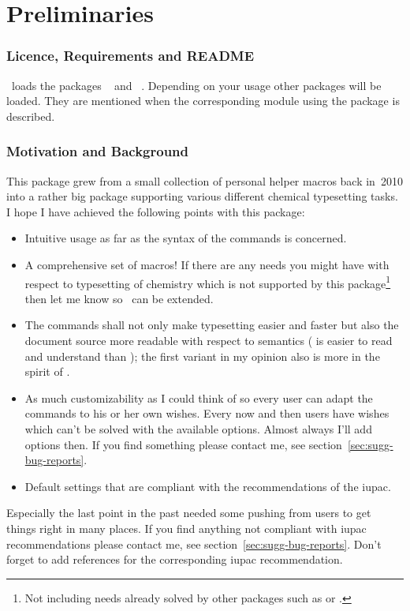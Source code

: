 \documentclass{chemmacros-manual}
\begin{document}
\part{Preliminaries}
\section{Licence, Requirements and \textsc{README}}\label{sec:licence-requ-readme}
\license

\chemmacros\ loads the packages ~\cite{bnd:l3kernel} and
~\cite{bnd:l3packages}.  Depending on your usage other packages
will be loaded.  They are mentioned when the corresponding module using the
package is described.

\section{Motivation and Background}\label{sec:motiv-backgr}
This package grew from a small collection of personal helper macros back
in~2010 into a rather big package supporting various different chemical
typesetting tasks.  I hope I have achieved the following points with this
package:
\begin{itemize}
  \item Intuitive usage as far as the syntax of the commands is concerned.
  \item A comprehensive set of macros! If there are any needs you might have
    with respect to typesetting of chemistry which is not supported by this
    package\footnote{Not including needs already solved by other packages such
      as  or .} then let me know so \chemmacros\ can
    be extended.
  \item The commands shall not only make typesetting easier and faster but
    also the document source more readable with respect to semantics
    ( is easier to read and understand than
    ); the first variant in my
    opinion also is more in the spirit of \LaTeXe.
  \item As much customizability as I could think of so every user can adapt
    the commands to his or her own wishes.  Every now and then users have
    wishes which can't be solved with the available options.  Almost always
    I'll add options then.  If you find something please contact me, see
    section~\vref{sec:sugg-bug-reports}.
  \item Default settings that are compliant with the recommendations of the
    \acf{iupac}.
\end{itemize}
Especially the last point in the past needed some pushing from users to get
things right in many places.  If you find anything not compliant with
\ac{iupac} recommendations please contact me, see
section~\vref{sec:sugg-bug-reports}.  Don't forget to add references for the
corresponding \ac{iupac} recommendation.
\end{document}
